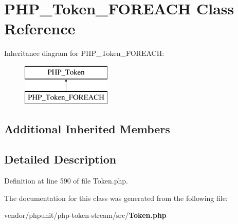 \section{P\+H\+P\+\_\+\+Token\+\_\+\+F\+O\+R\+E\+A\+C\+H Class Reference}
\label{class_p_h_p___token___f_o_r_e_a_c_h}
Inheritance diagram for P\+H\+P\+\_\+\+Token\+\_\+\+F\+O\+R\+E\+A\+C\+H\+:\begin{figure}[H]
\begin{center}
\leavevmode
\includegraphics[height=2.000000cm]{class_p_h_p___token___f_o_r_e_a_c_h}
\end{center}
\end{figure}
\subsection*{Additional Inherited Members}


\subsection{Detailed Description}


Definition at line 590 of file Token.\+php.



The documentation for this class was generated from the following file\+:\begin{DoxyCompactItemize}
\item 
vendor/phpunit/php-\/token-\/stream/src/{\bf Token.\+php}\end{DoxyCompactItemize}
